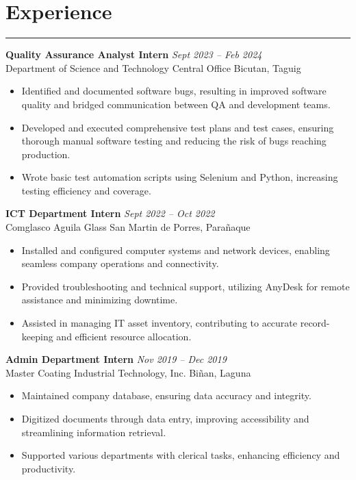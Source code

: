 \documentclass[a4paper, 10pt]{article}
\begin{document}
\section*{Experience}
\vspace{-1.5em}
\noindent\rule{\textwidth}{0.4pt}
\noindent \textbf{Quality Assurance Analyst Intern} \hfill \textit{Sept 2023 – Feb 2024} \\
Department of Science and Technology Central Office \hfill Bicutan, Taguig
\begin{itemize}[leftmargin=0.5in]
  \item Identified and documented software bugs, resulting in improved software quality and bridged communication between QA and development teams.
  \item Developed and executed comprehensive test plans and test cases, ensuring thorough manual software testing and reducing the risk of bugs reaching production.
  \item Wrote basic test automation scripts using Selenium and Python, increasing
        testing efficiency and coverage.
\end{itemize}
\noindent \textbf{ICT Department Intern} \hfill \textit{Sept 2022 – Oct 2022} \\
Comglasco Aguila Glass \hfill San Martin de Porres, Parañaque
\begin{itemize}[leftmargin=0.5in]
  \item Installed and configured computer systems and network devices, enabling
        seamless company operations and connectivity.
  \item Provided troubleshooting and technical support, utilizing AnyDesk for remote
        assistance and minimizing downtime.
  \item Assisted in managing IT asset inventory, contributing to accurate
        record-keeping and efficient resource allocation.
\end{itemize}
\noindent \textbf{Admin Department Intern} \hfill \textit{Nov 2019 – Dec 2019} \\
Master Coating Industrial Technology, Inc. \hfill Biñan, Laguna
\begin{itemize}[leftmargin=0.5in]
  \item Maintained company database, ensuring data accuracy and integrity.
  \item Digitized documents through data entry, improving accessibility and
        streamlining information retrieval.
  \item Supported various departments with clerical tasks, enhancing efficiency and
        productivity.
\end{itemize}
\end{document}
